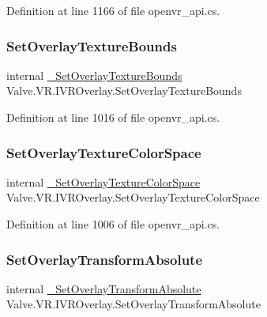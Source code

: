 Definition at line 1166 of file openvr\+\_\+api.\+cs.

\mbox{\label{struct_valve_1_1_v_r_1_1_i_v_r_overlay_a69b9a9c7772ad5ee43c3fc06176ca5c7}} 
\subsubsection{\texorpdfstring{SetOverlayTextureBounds}{SetOverlayTextureBounds}}
{\footnotesize\ttfamily internal \mbox{\hyperlink{struct_valve_1_1_v_r_1_1_i_v_r_overlay_a08630b9ab7638afe9502371ca7440300}{\+\_\+\+Set\+Overlay\+Texture\+Bounds}} Valve.\+V\+R.\+I\+V\+R\+Overlay.\+Set\+Overlay\+Texture\+Bounds}



Definition at line 1016 of file openvr\+\_\+api.\+cs.

\mbox{\label{struct_valve_1_1_v_r_1_1_i_v_r_overlay_a02e6c24983b395fedcf5997d628e0632}} 
\subsubsection{\texorpdfstring{SetOverlayTextureColorSpace}{SetOverlayTextureColorSpace}}
{\footnotesize\ttfamily internal \mbox{\hyperlink{struct_valve_1_1_v_r_1_1_i_v_r_overlay_adedd3e23f701f36634b7d6a228ec03e2}{\+\_\+\+Set\+Overlay\+Texture\+Color\+Space}} Valve.\+V\+R.\+I\+V\+R\+Overlay.\+Set\+Overlay\+Texture\+Color\+Space}



Definition at line 1006 of file openvr\+\_\+api.\+cs.

\mbox{\label{struct_valve_1_1_v_r_1_1_i_v_r_overlay_a0441939e81153de42173bd34641d1613}} 
\subsubsection{\texorpdfstring{SetOverlayTransformAbsolute}{SetOverlayTransformAbsolute}}
{\footnotesize\ttfamily internal \mbox{\hyperlink{struct_valve_1_1_v_r_1_1_i_v_r_overlay_a3c03a5b1bb15a5be4bc66a4cfeea8ebb}{\+\_\+\+Set\+Overlay\+Transform\+Absolute}} Valve.\+V\+R.\+I\+V\+R\+Overlay.\+Set\+Overlay\+Transform\+Absolute}



